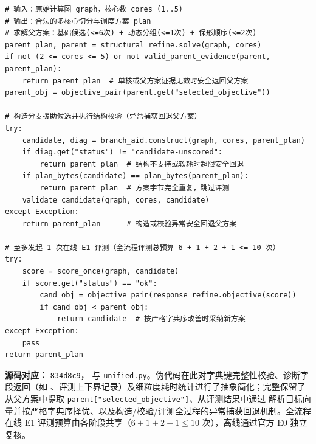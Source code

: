 \documentclass[anonymous,withtoc]{gmcm2026}
\renewcommand{\thealgorithm}{\thesection-\arabic{algorithm}}
\begin{document}
\FloatBarrier
\par{}\begingroup\normalsize
\captionsetup{type=algorithm,position=top,justification=raggedright,singlelinecheck=false,labelfont=bf}
\label{alg:p1-unified}
\nopagebreak
\begin{tcolorbox}[enhanced,breakable,colback=white,colframe=black,
  boxrule=0pt,toprule=.4pt,bottomrule=.4pt,sharp corners,boxsep=0pt,
  left=0pt,right=0pt,top=4pt,bottom=4pt,before skip=2pt,after skip=2pt,
  title after break={算法~\thealgorithm（续）},
  colbacktitle=white,coltitle=black,fonttitle=\normalsize\bfseries]


\begin{lstlisting}[style=paperpseudo]
# 输入：原始计算图 graph，核心数 cores (1..5)
# 输出：合法的多核心切分与调度方案 plan
# 求解父方案：基础候选(<=6次) + 动态分组(<=1次) + 保形顺序(<=2次)
parent_plan, parent = structural_refine.solve(graph, cores)
if not (2 <= cores <= 5) or not valid_parent_evidence(parent, parent_plan):
    return parent_plan  # 单核或父方案证据无效时安全返回父方案
parent_obj = objective_pair(parent.get("selected_objective"))

# 构造分支援助候选并执行结构校验（异常捕获回退父方案）
try:
    candidate, diag = branch_aid.construct(graph, cores, parent_plan)
    if diag.get("status") != "candidate-unscored":
        return parent_plan  # 结构不支持或软耗时超限安全回退
    if plan_bytes(candidate) == plan_bytes(parent_plan):
        return parent_plan  # 方案字节完全重复，跳过评测
    validate_candidate(graph, cores, candidate)
except Exception:
    return parent_plan      # 构造或校验异常安全回退父方案

# 至多发起 1 次在线 E1 评测（全流程评测总预算 6 + 1 + 2 + 1 <= 10 次）
try:
    score = score_once(graph, candidate)
    if score.get("status") == "ok":
        cand_obj = objective_pair(response_refine.objective(score))
        if cand_obj < parent_obj:
            return candidate  # 按严格字典序改善时采纳新方案
except Exception:
    pass
return parent_plan
\end{lstlisting}
\textbf{源码对应：} \texttt{834d8c9}，\texttt{} 与 \texttt{unified.py}。伪代码在此对字典键完整性校验、诊断字段返回（如 \texttt{}、评测上下界记录）及细粒度耗时统计进行了抽象简化；完整保留了从父方案中提取 \texttt{parent{[}"selected\_objective"{]}}、从评测结果中通过 \texttt{} 解析目标向量并按严格字典序择优、以及构造/校验/评测全过程的异常捕获回退机制。全流程在线 E1 评测预算由各阶段共享（\(6 + 1 + 2 + 1 \le 10\) 次），离线通过官方 E0 独立复核。

\end{tcolorbox}\endgroup
\end{document}
